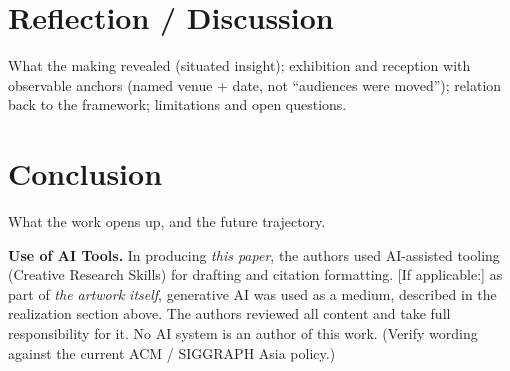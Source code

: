 \documentclass[sigconf,nonacm]{acmart}
\begin{document}
\section{Reflection / Discussion}
What the making revealed (situated insight); exhibition and reception with
observable anchors (named venue + date, not ``audiences were moved''); relation
back to the framework; limitations and open questions.

\section{Conclusion}
What the work opens up, and the future trajectory.

\begin{acks}
\textbf{Use of AI Tools.} In producing \emph{this paper}, the authors used
AI-assisted tooling (Creative Research Skills) for drafting and citation
formatting. [If applicable:] as part of \emph{the artwork itself}, generative AI
was used as a medium, described in the realization section above. The authors
reviewed all content and take full responsibility for it. No AI system is an
author of this work. (Verify wording against the current ACM / SIGGRAPH Asia
policy.)
\end{acks}



\end{document}
